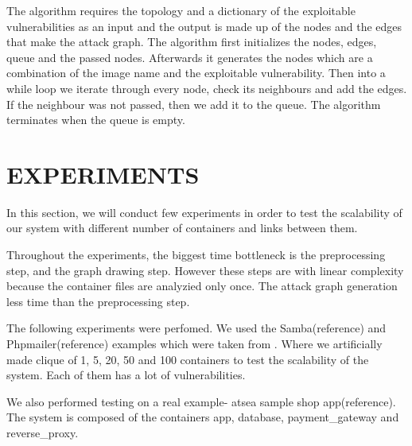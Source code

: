 \documentclass[letterpaper, 10 pt, conference]{ieeeconf}  %
\begin{document}
The algorithm requires the topology and a dictionary of the exploitable vulnerabilities as an input and the output is made up of the nodes and the edges that make the attack graph. 
The algorithm first initializes the nodes, edges, queue and the passed nodes. Afterwards it generates the nodes which are a combination of the image name and the exploitable vulnerability.
Then into a while loop we iterate through every node, check its neighbours and add the edges. If the neighbour was not passed, then we add it to the queue. The algorithm terminates when the queue is empty.

\section{EXPERIMENTS}

In this section, we will conduct few experiments in order to test the scalability of our system with different number of containers and links between them.

Throughout the experiments, the biggest time bottleneck is the preprocessing step, and the graph drawing step. However these steps are with linear complexity because the container files are analyzied only once. The attack graph generation less time than the preprocessing step.

The following experiments were perfomed. We used the Samba(reference) and Phpmailer(reference) examples which were taken from . Where we artificially made clique of 1, 5, 20, 50 and 100 containers to test the scalability of the system. Each of them has a lot of vulnerabilities.

We also performed testing on a real example- atsea sample shop app(reference). The system is composed of the containers app, database, payment_gateway and reverse_proxy.
\end{document}

